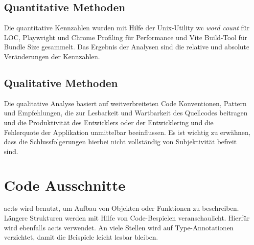 \subsection{Quantitative Methoden}
Die quantitative Kennzahlen wurden mit Hilfe der Unix-Utility wc \textit{word count} für LOC, Playwright und Chrome Profiling für Performance und Vite Build-Tool für Bundle Size gesammelt. Das Ergebnis der Analysen sind die relative und absolute Veränderungen der Kennzahlen.

\subsection {Qualitative Methoden}
Die qualitative Analyse basiert auf weitverbreiteten Code Konventionen, Pattern und Empfehlungen, die zur Lesbarkeit und Wartbarkeit des Quellcodes beitragen und die Produktivität des Entwicklers oder der Entwicklering und die Fehlerquote der Applikation unmittelbar beeinflussen. Es ist wichtig zu erwähnen, dass die Schlussfolgerungen hierbei nicht vollständig von Subjektivität befreit sind.

\section{Code Ausschnitte}

\acrlong{ac:ts} wird benutzt, um Aufbau von Objekten oder Funktionen zu beschreiben. Längere Strukturen werden mit Hilfe von Code-Bespielen veranschaulicht. Hierfür wird ebenfalls \acrlong{ac:ts} verwendet. An viele Stellen wird auf Type-Annotationen verzichtet, damit die Beispiele leicht lesbar bleiben.